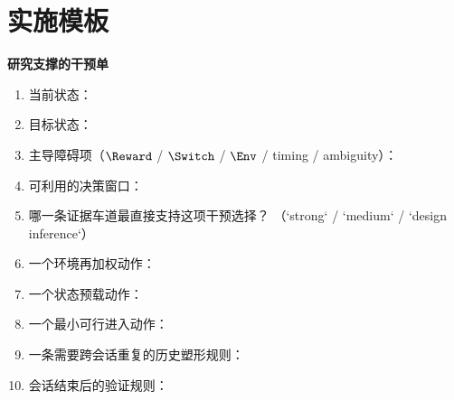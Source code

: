 \section{实施模板}

\begin{templatebox}
\textbf{研究支撑的干预单}
\begin{enumerate}[nosep]
  \item 当前状态：
  \item 目标状态：
  \item 主导障碍项（$\Reward$ / $\Switch$ / $\Env$ / timing / ambiguity）：
  \item 可利用的决策窗口：
  \item 哪一条证据车道最直接支持这项干预选择？
        （`strong` / `medium` / `design inference`）
  \item 一个环境再加权动作：
  \item 一个状态预载动作：
  \item 一个最小可行进入动作：
  \item 一条需要跨会话重复的历史塑形规则：
  \item 会话结束后的验证规则：
\end{enumerate}
\end{templatebox}